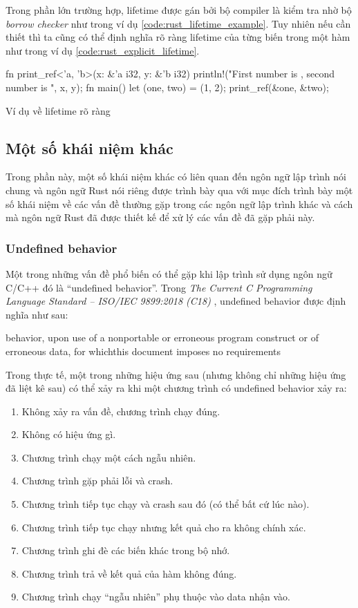 Trong phần lớn trường hợp, lifetime được gán bởi bộ compiler là kiểm tra nhờ bộ \emph{borrow checker} như trong ví dụ \ref{code:rust_lifetime_example}.
Tuy nhiên nếu cần thiết thì ta cũng có thể định nghĩa rõ ràng lifetime của từng biến trong một hàm như trong ví dụ \ref{code:rust_explicit_lifetime}.
\begin{listing}[H]
\begin{rustcode}
fn print_ref<'a, 'b>(x: &'a i32, y: &'b i32) {
    println!("First number is {}, second number is {}", x, y);
}
fn main() {
  let (one, two) = (1, 2);
  print_ref(&one, &two);
}
\end{rustcode}
\caption{Ví dụ về lifetime rõ ràng}
\label{code:rust_explicit_lifetime}
\end{listing}

\subsection{Một số khái niệm khác}
Trong phần này, một số khái niệm khác có liên quan đến ngôn ngữ lập trình nói chung và ngôn ngữ Rust nói riêng được trình bày qua với mục đích trình bày một số khái niệm về các vấn đề thường gặp trong các ngôn ngữ lập trình khác và cách mà ngôn ngữ Rust đã được thiết kế để xử lý các vấn đề đã gặp phải này.
\subsubsection{Undefined behavior}
Một trong những vấn đề phổ biến có thể gặp khi lập trình sử dụng ngôn ngữ C/C++ đó là ``undefined behavior''. Trong \emph{The Current C Programming Language Standard – ISO/IEC 9899:2018 (C18)} \cite{iso_iec_9899}, undefined behavior được định nghĩa như sau:

 behavior, upon use of a nonportable or erroneous program construct or of erroneous data, for whichthis document imposes no requirements

Trong thực tế, một trong những hiệu ứng sau (nhưng không chỉ những hiệu ứng đã liệt kê sau) có thể xảy ra khi một chương trình có undefined behavior xảy ra:

\begin{enumerate}
    \item Không xảy ra vấn đề, chương trình chạy đúng.
    \item Không có hiệu ứng gì.
    \item Chương trình chạy một cách ngẫu nhiên.
    \item Chương trình gặp phải lỗi và crash.
    \item Chương trình tiếp tục chạy và crash sau đó (có thể bất cứ lúc nào).
    \item Chương trình tiếp tục chạy nhưng kết quả cho ra không chính xác.
    \item Chương trình ghi đè các biến khác trong bộ nhớ.
    \item Chương trình trả về kết quả của hàm không đúng.
    \item Chương trình chạy ``ngẫu nhiên'' phụ thuộc vào data nhận vào.
\end{enumerate}

